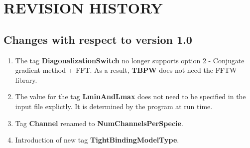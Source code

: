 \section{REVISION HISTORY}

\subsection{Changes with respect to version 1.0}

\begin{enumerate}
\item The tag {\bf DiagonalizationSwitch} no longer supports option 2
  - Conjugate gradient method + FFT. As a result, {\bf TBPW} does not
  need the FFTW library.
\item The value for the tag {\bf LminAndLmax} does not need to be specified in the input file explictly. It is determined by the program at run time.
\item Tag {\bf Channel} renamed to {\bf NumChannelsPerSpecie}.
\item Introduction of new tag {\bf TightBindingModelType}.
\end{enumerate}
